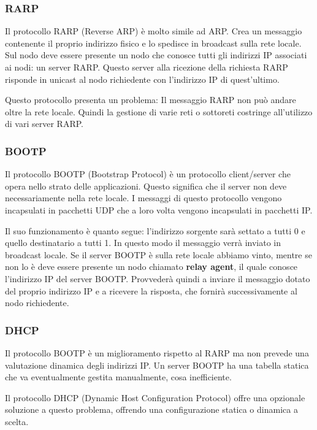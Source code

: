         \subsubsection{RARP}
            Il protocollo RARP (Reverse ARP) è molto simile ad ARP. Crea un messaggio contenente il proprio indirizzo fisico e lo spedisce in broadcast sulla rete locale. Sul nodo deve essere presente un nodo che conosce tutti gli indirizzi IP associati ai nodi: un server RARP. Questo server alla ricezione della richiesta RARP risponde in unicast al nodo richiedente con l'indirizzo IP di quest'ultimo.
            
            Questo protocollo presenta un problema: Il messaggio RARP non può andare oltre la rete locale. Quindi la gestione di varie reti o sottoreti costringe all'utilizzo di vari server RARP.
            
        \subsubsection{BOOTP}
            Il protocollo BOOTP (Bootstrap Protocol) è un protocollo client/server che opera nello strato delle applicazioni. Questo significa che il server non deve necessariamente nella rete locale. I messaggi di questo protocollo vengono incapsulati in pacchetti UDP che a loro volta vengono incapsulati in pacchetti IP.
            
            Il suo funzionamento è quanto segue: l'indirizzo sorgente sarà settato a tutti 0 e quello destinatario a tutti 1. In questo modo il messaggio verrà inviato in broadcast locale. Se il server BOOTP è sulla rete locale abbiamo vinto, mentre se non lo è deve essere presente un nodo chiamato \textbf{relay agent}, il quale conosce l'indirizzo IP del server BOOTP. Provvederà quindi a inviare il messaggio dotato del proprio indirizzo IP e a ricevere la risposta, che fornirà successivamente al nodo richiedente.
            
        \subsubsection{DHCP}
            Il protocollo BOOTP è un miglioramento rispetto al RARP ma non prevede una valutazione dinamica degli indirizzi IP. Un server BOOTP ha una tabella statica che va eventualmente gestita manualmente, cosa inefficiente.
            
            Il protocollo DHCP (Dynamic Host Configuration Protocol) offre una opzionale soluzione a questo problema, offrendo una configurazione statica o dinamica a scelta.
            
